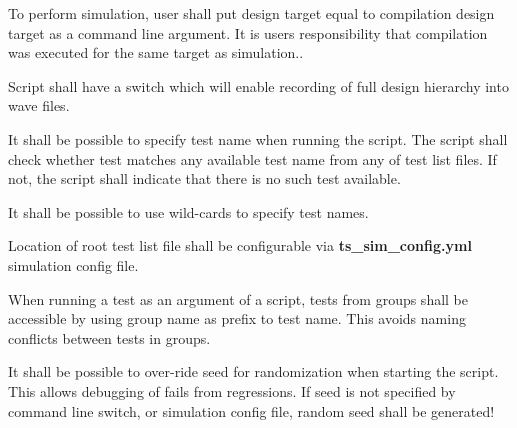 \documentclass{tropic_design_spec}
\begin{document}

    {To perform simulation, user shall put design target equal to compilation design
     target as a command line argument. It is users responsibility that compilation was
     executed for the same target as simulation.}.


    {Script shall have a switch which will enable recording of full design hierarchy into
     wave files}.


    {It shall be possible to specify test name when running the script. The script shall
     check whether test matches any available test name from any of test list files. If
     not, the script shall indicate that there is no such test available.} 


    {It shall be possible to use wild-cards to specify test names.}


    {Location of root test list file shall be configurable via \textbf{ts_sim_config.yml}
    simulation config file.}


    {When running a test as an argument of a script, tests from groups shall be accessible
     by using group name as prefix to test name. This avoids naming conflicts between
     tests in groups.}


    {It shall be possible to over-ride seed for randomization when starting the script.
     This allows debugging of fails from regressions. If seed is not specified by 
     command line switch, or simulation config file, random seed shall be generated!}

\end{document}
